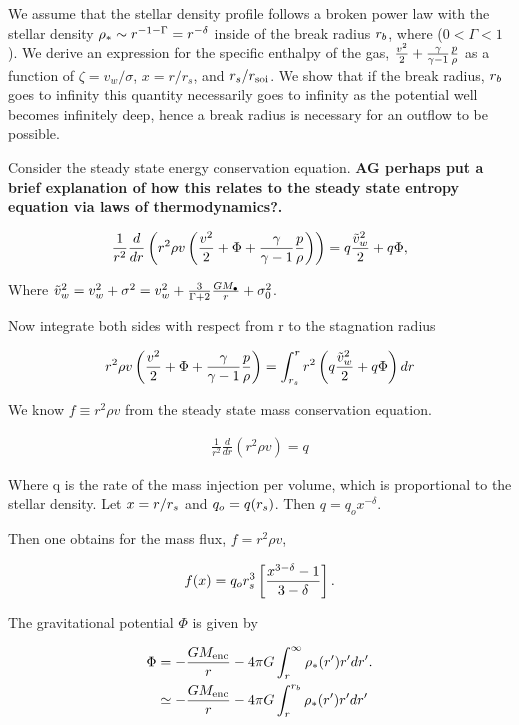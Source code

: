 We assume that the stellar density profile follows a broken power law
with the stellar density $\rho_*\sim r^{-1-\Gamma}= r^{-\delta}$ inside of the
break radius $r_b$, where ($0<\Gamma<1$). We derive an expression for
the specific enthalpy of the gas, $\frac{v^2}{2} +\frac{\gamma}{\gamma-1} \frac{p}{\rho}$ as a
function of $\zeta=v_w/\sigma$, $x=r/r_s$, and $r_s/r_{\rm soi}$. We show
that if the break radius, $r_b$ goes to infinity this quantity
necessarily goes to infinity as the potential well becomes infinitely
deep, hence a break radius is necessary for an outflow to be possible.

Consider the steady state energy conservation equation. {\bf AG perhaps
  put a brief explanation of how this relates to the steady state
  entropy equation via laws of thermodynamics?.}

\begin{align}
\frac{1}{r^2} \frac{d}{dr} \left(r^2 \rho v \left(\frac{v^2}{2} + \Phi
    + \frac{\gamma}{\gamma-1} \frac{p}{\rho}\right) \right) = q \frac{\tilde{v}_{w}^2}{2} + q \Phi,
\label{eq:enCons}
\end{align}

Where $\tilde{v}_{w}^2=v_w^2+\sigma^2= v_w^2+\frac{3}{\Gamma+2}\frac{G
  M_{\bullet}}{r}+\sigma_0^2$.

Now integrate both sides with respect from r to the stagnation radius 

\begin{align}
  r^2 \rho v \left(\frac{v^2}{2}+\Phi+\frac{\gamma}{\gamma-1} \frac{p}{\rho} \right)= \int_{r_s}^{r}
    r^2 \left(q \frac{\tilde{v}_{w}^2}{2} + q\Phi\right) dr
    \label{eq:enConsInt}
\end{align}

We know $f\equiv r^2 \rho v$ from the steady state mass conservation
equation. 

\begin{align}
 \frac{1}{r^2} \frac{d}{dr} \left(r^2 \rho v\right) = q 
\end{align}

Where q is the rate of the mass injection per volume, which is
proportional to the stellar density. Let $x=r/r_s$ and $q_o= q
(r_s)$. Then $q=q_o x^{-\delta}$. 

Then one obtains for the mass flux, $f=r^2 \rho v$,

\begin{align}
 f(x)=q_o r_s^3 \left[\frac{x^{3-\delta}-1}{3-\delta}\right].
 \label{eq:massFlux}
\end{align}

The gravitational potential $\Phi$ is given by

\begin{align}
\Phi&= -\frac{G M_{\rm enc}}{r} - 4 \pi G \int_{r}^{\infty} \rho_*(r') r'
dr'.\nonumber\\
&\simeq -\frac{G M_{\rm enc}}{r} -4 \pi G \int_{r}^{r_b} \rho_*(r') r' dr'
\label{eq:Phi}
\end{align}

